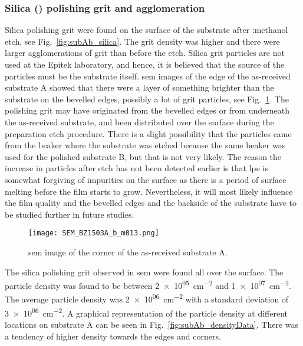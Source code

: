 \subsubsection{Silica () polishing grit and agglomeration}

Silica polishing grit were found on the surface of the substrate after :methanol etch, see Fig.~\ref{fig:subAb_silica}. The grit density was higher and there were larger agglomerations of grit than before the etch. Silica grit particles are not used at the Epitek laboratory, and hence, it is believed that the source of the particles must be the substrate itself. \Ac{sem} images of the edge of the as-received substrate A showed that there were a layer of something brighter than the substrate on the bevelled edges, possibly a lot of grit particles, see Fig.~\ref{fig:subAa_corner_w_grit}. The polishing grit may have originated from the bevelled edges or from underneath the as-received substrate, and been distributed over the surface during the preparation etch procedure. There is a slight possibility that the particles came from the beaker where the substrate was etched because the same beaker was used for the polished substrate B, but that is not very likely. The reason the increase in particles after etch has not been detected earlier is that \ac{lpe} is somewhat forgiving of impurities on the surface as there is a period of surface melting before the film starts to grow. Nevertheless, it will most likely influence the film quality and the bevelled edges and the backside of the substrate have to be studied further in future studies.

\begin{figure}[htbp]
    \centering
    \texttt{[image: SEM\_BZ1503A\_b\_m013.png]}
    \caption{\Ac{sem} image of the corner of the as-received substrate A.}
    \label{fig:subAa_corner_w_grit}
\end{figure}

The silica polishing grit observed in \ac{sem} were found all over the surface. The particle density was found to be between \SI{2e+05}{\centi\metre^{-2}} and \SI{1e+07}{\centi\metre^{-2}}. The average particle density was \SI{2e+06}{\centi\metre^{-2}} with a standard deviation of \SI{3e+06}{\centi\metre^{-2}}. A graphical representation of the particle density at different locations on substrate A can be seen in Fig.~\ref{fig:subAb_densityData}. There was a tendency of higher density towards the edges and corners.

